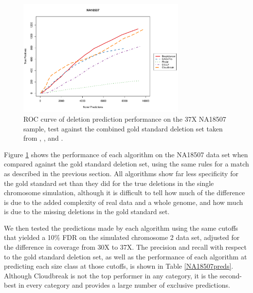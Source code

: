 \documentclass[11pt]{article}
\begin{document}
\begin{figure}[t]
\centering
\includegraphics[width=0.75\textwidth]{NA18507_ROC.pdf}
\caption{ROC curve of deletion prediction performance on the 37X NA18507 sample, test against the combined gold standard deletion set taken from \textcite{Kidd:2008p926}, \textcite{Mills:2011fi}, and \textcite{GenomesProjectConsortium:2012co}.}
\label{NA18507roc}
\end{figure}

Figure \ref{NA18507roc} shows the performance of each algorithm on the NA18507 data set when compared against the gold standard deletion set, using the same rules for a match as described in the previous section. All algorithms show far less specificity for the gold standard set than they did for the true deletions in the single chromosome simulation, although it is difficult to tell how much of the difference is due to the added complexity of real data and a whole genome, and how much is due to the missing deletions in the gold standard set. 

We then tested the predictions made by each algorithm using the same cutoffs that yielded a 10\% FDR on the simulated chromosome 2 data set, adjusted for the difference in coverage from 30X to 37X. The precision and recall with respect to the gold standard deletion set, as well as the performance of each algorithm at predicting each size class at those cutoffs, is shown in Table \ref{NA18507preds}. Although Cloudbreak is not the top performer in any category, it is the second-best in every category and provides a large number of exclusive predictions.
\end{document}
